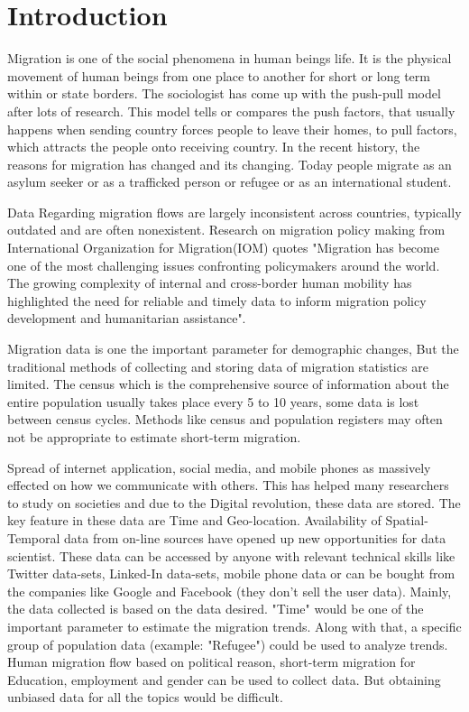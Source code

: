 \chapter{Introduction}\label{chap:introduction}
Migration is one of the social phenomena in human beings life. It is the physical movement of human beings from one place to another for short or long term within or state borders. The sociologist has come up with the push-pull model after lots of research. This model tells or compares the push factors, that usually happens when sending country forces people to leave their homes, to pull factors, which attracts the people onto receiving country. In the recent history, the reasons for migration has changed and its changing. Today people migrate as an asylum seeker or as a trafficked person or refugee or as an international student.

Data Regarding migration flows are largely inconsistent across countries, typically outdated and
are often nonexistent. Research on migration policy making from International Organization for
Migration(IOM)  \cite{IOM's} quotes "Migration has become one of the most challenging issues confronting
policymakers around the world. The growing complexity of internal and cross-border human mobility
has highlighted the need for reliable and timely data to inform migration policy development
and humanitarian assistance". 

Migration data is one the important parameter for demographic changes, But the traditional methods of collecting and storing data of migration statistics are limited. The census which is the comprehensive source of information about the entire population usually takes place every 5 to 10 years, some data is lost between census cycles. Methods like census and population registers may often not be appropriate to estimate short-term migration. 

Spread of internet application, social media, and mobile phones as massively effected on how we communicate with others. This has helped many researchers to study on societies and due to the Digital revolution, these data are stored. The key feature in these data are Time and Geo-location. Availability of Spatial-Temporal data from on-line sources have opened up new opportunities for data scientist. These data can be accessed by anyone with relevant technical skills like Twitter data-sets, Linked-In data-sets, mobile phone data or can be bought from the companies like Google and Facebook (they don't sell the user data). Mainly, the data collected is based on the data desired. "Time" would be one of the important parameter to estimate the migration trends. Along with that, a specific group of population data (example: "Refugee") could be used to analyze trends. Human migration flow based on political reason, short-term migration for Education, employment and gender can be used to collect data. But obtaining unbiased data for all the topics would be difficult. 

